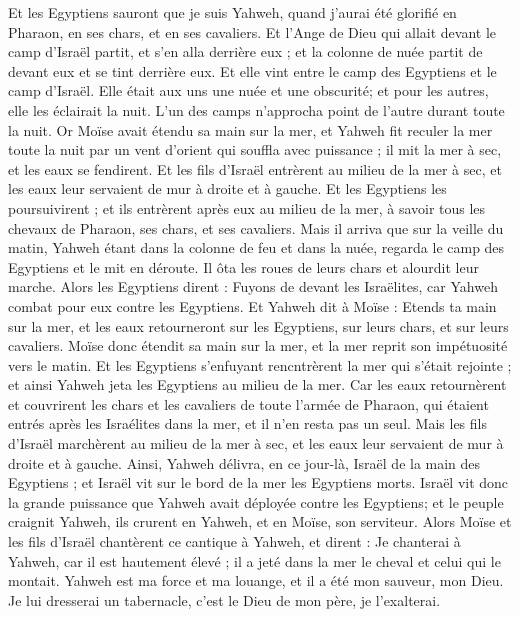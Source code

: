 \begin{multicols}{2}
Et les Egyptiens sauront que je suis Yahweh, quand j'aurai été glorifié en Pharaon, en ses chars, et en ses cavaliers.
Et l'Ange de Dieu qui allait devant le camp d'Israël partit, et s'en alla derrière eux ; et la colonne de nuée partit de devant eux et se tint derrière eux.
Et elle vint entre le camp des Egyptiens et le camp d'Israël. Elle était aux uns une nuée et une obscurité; et pour les autres, elle les éclairait la nuit. L'un des camps n'approcha point de l'autre durant toute la nuit.
Or Moïse avait étendu sa main sur la mer, et Yahweh fit reculer la mer toute la nuit par un vent d'orient qui souffla avec puissance ; il mit la mer à sec, et les eaux se fendirent.
Et les fils d'Israël entrèrent au milieu de la mer à sec, et les eaux leur servaient de mur à droite et à gauche.
Et les Egyptiens les poursuivirent ; et ils entrèrent après eux au milieu de la mer, à savoir tous les chevaux de Pharaon, ses chars, et ses cavaliers.
Mais il arriva que sur la veille du matin, Yahweh étant dans la colonne de feu et dans la nuée, regarda le camp des Egyptiens et le mit en déroute.
Il ôta les roues de leurs chars et alourdit leur marche. Alors les Egyptiens dirent : Fuyons  de devant les Israëlites, car Yahweh combat pour eux contre les Egyptiens.
Et Yahweh dit à Moïse : Etends ta main sur la mer, et les eaux retourneront sur les Egyptiens, sur leurs chars, et sur leurs cavaliers.
Moïse donc étendit sa main sur la mer, et la mer reprit son impétuosité vers le matin. Et les Egyptiens s'enfuyant rencntrèrent la mer qui s'était rejointe ; et ainsi Yahweh jeta les Egyptiens au milieu de la mer.
Car les eaux retournèrent et couvrirent les chars et les cavaliers de toute l'armée de Pharaon, qui étaient entrés après les Israélites dans la mer, et il n'en resta pas un seul.
Mais les fils d'Israël marchèrent au milieu de la mer à sec, et les eaux leur servaient de mur à droite et à gauche.
Ainsi, Yahweh délivra, en ce jour-là, Israël de la main des Egyptiens ; et Israël vit sur le bord de la mer les Egyptiens morts.
Israël vit donc la grande puissance que Yahweh avait déployée contre les Egyptiens; et le peuple craignit Yahweh, ils crurent en Yahweh, et en Moïse, son serviteur.
\VerseOne{}Alors Moïse et les fils d'Israël chantèrent ce cantique à Yahweh, et dirent : Je chanterai à Yahweh, car il est hautement élevé ; il a jeté dans la mer le cheval et celui qui le montait.
Yahweh est ma force et ma louange, et il a été mon sauveur, mon Dieu. Je lui dresserai un tabernacle, c'est le Dieu de mon père, je l'exalterai.

\end{multicols}
